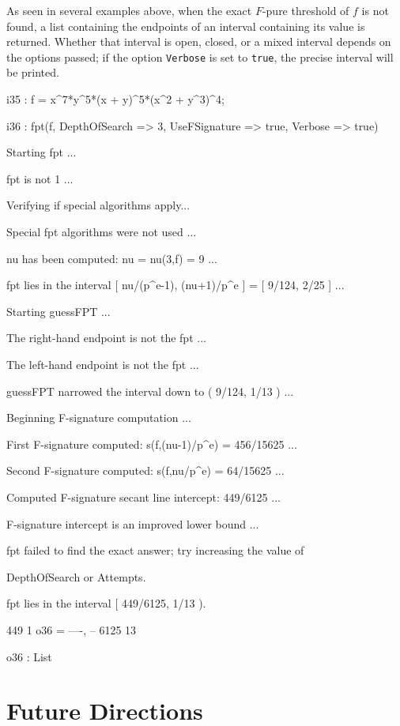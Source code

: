 \documentclass{amsart}
\begin{document}
As seen in several examples above, when the exact  $F$-pure threshold of $f$ is not found, a list containing the endpoints of an interval containing its value is returned.  Whether that interval is open, closed, or a mixed interval depends on the options passed; if the option {\tt Verbose} is set to {\tt true}, the precise interval will be printed.

{\small
{}
\begin{MyVerbatim}

i35 : f = x^7*y^5*(x + y)^5*(x^2 + y^3)^4;

i36 : fpt(f, DepthOfSearch => 3, UseFSignature => true, Verbose => true)

Starting fpt ...

fpt is not 1 ...

Verifying if special algorithms apply...

Special fpt algorithms were not used ...

nu has been computed: nu = nu(3,f) = 9 ...

fpt lies in the interval [ nu/(p^e-1), (nu+1)/p^e ] = [ 9/124, 2/25 ] ...

Starting guessFPT ...

The right-hand endpoint is not the fpt ...

The left-hand endpoint is not the fpt ...

guessFPT narrowed the interval down to ( 9/124, 1/13 ) ...

Beginning F-signature computation ...

First F-signature computed: s(f,(nu-1)/p^e) = 456/15625 ...

Second F-signature computed: s(f,nu/p^e) = 64/15625 ...

Computed F-signature secant line intercept: 449/6125 ...

F-signature intercept is an improved lower bound ...

fpt failed to find the exact answer; try increasing the value of

DepthOfSearch or Attempts.

fpt lies in the interval [ 449/6125, 1/13 ).

        449   1
o36 = {----, --}
       6125  13

o36 : List
\end{MyVerbatim}
}
\medspace


\newpage
\section{Future Directions}
\end{document}

